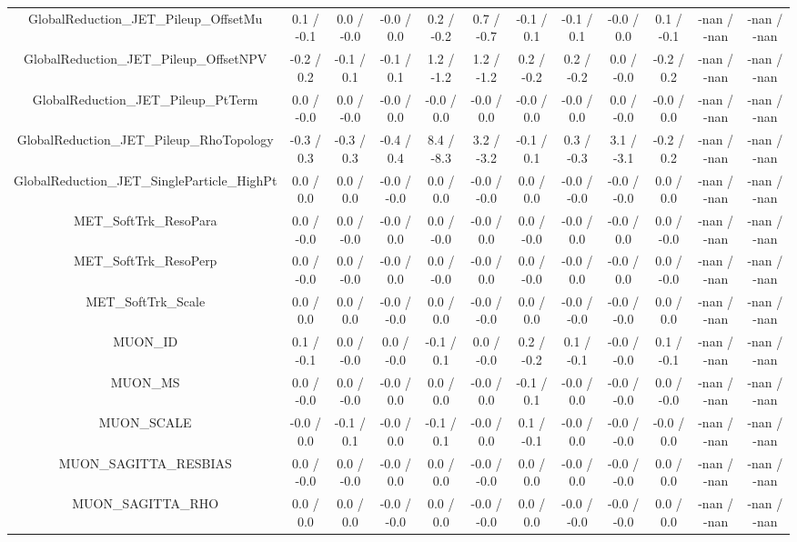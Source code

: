 \begin{table}[htbp]
\begin{center}
\begin{tabular}{|c|c|c|c|c|c|c|c|c|c|c|c|}
  GlobalReduction_JET_Pileup_OffsetMu & 0.1 / -0.1 & 0.0 / -0.0 & -0.0 / 0.0 & 0.2 / -0.2 & 0.7 / -0.7 & -0.1 / 0.1 & -0.1 / 0.1 & -0.0 / 0.0 & 0.1 / -0.1 & -nan / -nan & -nan / -nan \\ 
  GlobalReduction_JET_Pileup_OffsetNPV & -0.2 / 0.2 & -0.1 / 0.1 & -0.1 / 0.1 & 1.2 / -1.2 & 1.2 / -1.2 & 0.2 / -0.2 & 0.2 / -0.2 & 0.0 / -0.0 & -0.2 / 0.2 & -nan / -nan & -nan / -nan \\ 
  GlobalReduction_JET_Pileup_PtTerm & 0.0 / -0.0 & 0.0 / -0.0 & -0.0 / 0.0 & -0.0 / 0.0 & -0.0 / 0.0 & -0.0 / 0.0 & -0.0 / 0.0 & 0.0 / -0.0 & -0.0 / 0.0 & -nan / -nan & -nan / -nan \\ 
  GlobalReduction_JET_Pileup_RhoTopology & -0.3 / 0.3 & -0.3 / 0.3 & -0.4 / 0.4 & 8.4 / -8.3 & 3.2 / -3.2 & -0.1 / 0.1 & 0.3 / -0.3 & 3.1 / -3.1 & -0.2 / 0.2 & -nan / -nan & -nan / -nan \\ 
  GlobalReduction_JET_SingleParticle_HighPt & 0.0 / 0.0 & 0.0 / 0.0 & -0.0 / -0.0 & 0.0 / 0.0 & -0.0 / -0.0 & 0.0 / 0.0 & -0.0 / -0.0 & -0.0 / -0.0 & 0.0 / 0.0 & -nan / -nan & -nan / -nan \\ 
  MET_SoftTrk_ResoPara & 0.0 / -0.0 & 0.0 / -0.0 & -0.0 / 0.0 & 0.0 / -0.0 & -0.0 / 0.0 & 0.0 / -0.0 & -0.0 / 0.0 & -0.0 / 0.0 & 0.0 / -0.0 & -nan / -nan & -nan / -nan \\ 
  MET_SoftTrk_ResoPerp & 0.0 / -0.0 & 0.0 / -0.0 & -0.0 / 0.0 & 0.0 / -0.0 & -0.0 / 0.0 & 0.0 / -0.0 & -0.0 / 0.0 & -0.0 / 0.0 & 0.0 / -0.0 & -nan / -nan & -nan / -nan \\ 
  MET_SoftTrk_Scale & 0.0 / 0.0 & 0.0 / 0.0 & -0.0 / -0.0 & 0.0 / 0.0 & -0.0 / -0.0 & 0.0 / 0.0 & -0.0 / -0.0 & -0.0 / -0.0 & 0.0 / 0.0 & -nan / -nan & -nan / -nan \\ 
  MUON_ID & 0.1 / -0.1 & 0.0 / -0.0 & 0.0 / -0.0 & -0.1 / 0.1 & 0.0 / -0.0 & 0.2 / -0.2 & 0.1 / -0.1 & -0.0 / -0.0 & 0.1 / -0.1 & -nan / -nan & -nan / -nan \\ 
  MUON_MS & 0.0 / -0.0 & 0.0 / -0.0 & -0.0 / 0.0 & 0.0 / 0.0 & -0.0 / 0.0 & -0.1 / 0.1 & -0.0 / 0.0 & -0.0 / -0.0 & 0.0 / -0.0 & -nan / -nan & -nan / -nan \\ 
  MUON_SCALE & -0.0 / 0.0 & -0.1 / 0.1 & -0.0 / 0.0 & -0.1 / 0.1 & -0.0 / 0.0 & 0.1 / -0.1 & -0.0 / 0.0 & -0.0 / -0.0 & -0.0 / 0.0 & -nan / -nan & -nan / -nan \\ 
  MUON_SAGITTA_RESBIAS & 0.0 / -0.0 & 0.0 / -0.0 & -0.0 / 0.0 & 0.0 / 0.0 & -0.0 / -0.0 & 0.0 / 0.0 & -0.0 / 0.0 & -0.0 / -0.0 & 0.0 / 0.0 & -nan / -nan & -nan / -nan \\ 
  MUON_SAGITTA_RHO & 0.0 / 0.0 & 0.0 / 0.0 & -0.0 / -0.0 & 0.0 / 0.0 & -0.0 / -0.0 & 0.0 / 0.0 & -0.0 / -0.0 & -0.0 / -0.0 & 0.0 / 0.0 & -nan / -nan & -nan / -nan \\ 

\end{tabular}
\end{center}
\end{table}
